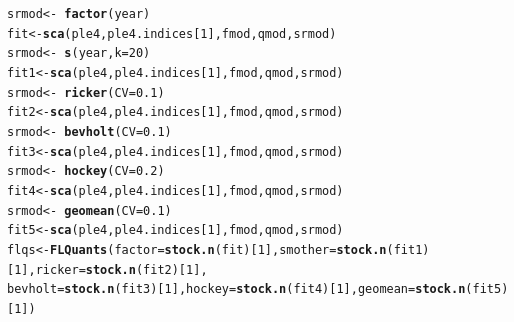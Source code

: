 \documentclass[a4paper,english,10pt]{article}\usepackage[]{graphicx}\usepackage[]{color}
\makeatletter
\newcommand{\hlnum}[1]{\textcolor[rgb]{0.686,0.059,0.569}{#1}}%
\newcommand{\hlopt}[1]{\textcolor[rgb]{0,0,0}{#1}}%
\newcommand{\hlstd}[1]{\textcolor[rgb]{0.345,0.345,0.345}{#1}}%
\newcommand{\hlkwb}[1]{\textcolor[rgb]{0.69,0.353,0.396}{#1}}%
\newcommand{\hlkwc}[1]{\textcolor[rgb]{0.333,0.667,0.333}{#1}}%
\newcommand{\hlkwd}[1]{\textcolor[rgb]{0.737,0.353,0.396}{\textbf{#1}}}%
\newenvironment{kframe}{%
 \def\at@end@of@kframe{}%
 \ifinner\ifhmode%
  \def\at@end@of@kframe{\end{minipage}}%
  \begin{minipage}{\columnwidth}%
 \fi\fi%
 \def\FrameCommand##1{\hskip\@totalleftmargin \hskip-\fboxsep
 \colorbox{shadecolor}{##1}\hskip-\fboxsep
     \hskip-\linewidth \hskip-\@totalleftmargin \hskip\columnwidth}%
 \MakeFramed {\advance\hsize-\width
   \@totalleftmargin\z@ \linewidth\hsize
   \@setminipage}}%
 {\par\unskip\endMakeFramed%
 \at@end@of@kframe}
\newenvironment{knitrout}{}{} %
\makeatother
\begin{document}
\begin{knitrout}
\color{fgcolor}\begin{kframe}
\begin{alltt}
\hlstd{srmod} \hlkwb{<-} \hlopt{~}\hlkwd{factor}\hlstd{(year)}
\hlstd{fit} \hlkwb{<-} \hlkwd{sca}\hlstd{(ple4, ple4.indices[}\hlnum{1}\hlstd{], fmod, qmod, srmod)}
\hlstd{srmod} \hlkwb{<-} \hlopt{~}\hlkwd{s}\hlstd{(year,} \hlkwc{k} \hlstd{=} \hlnum{20}\hlstd{)}
\hlstd{fit1} \hlkwb{<-} \hlkwd{sca}\hlstd{(ple4, ple4.indices[}\hlnum{1}\hlstd{], fmod, qmod, srmod)}
\hlstd{srmod} \hlkwb{<-} \hlopt{~}\hlkwd{ricker}\hlstd{(}\hlkwc{CV} \hlstd{=} \hlnum{0.1}\hlstd{)}
\hlstd{fit2} \hlkwb{<-} \hlkwd{sca}\hlstd{(ple4, ple4.indices[}\hlnum{1}\hlstd{], fmod, qmod, srmod)}
\hlstd{srmod} \hlkwb{<-} \hlopt{~}\hlkwd{bevholt}\hlstd{(}\hlkwc{CV} \hlstd{=} \hlnum{0.1}\hlstd{)}
\hlstd{fit3} \hlkwb{<-} \hlkwd{sca}\hlstd{(ple4, ple4.indices[}\hlnum{1}\hlstd{], fmod, qmod, srmod)}
\hlstd{srmod} \hlkwb{<-} \hlopt{~}\hlkwd{hockey}\hlstd{(}\hlkwc{CV} \hlstd{=} \hlnum{0.2}\hlstd{)}
\hlstd{fit4} \hlkwb{<-} \hlkwd{sca}\hlstd{(ple4, ple4.indices[}\hlnum{1}\hlstd{], fmod, qmod, srmod)}
\hlstd{srmod} \hlkwb{<-} \hlopt{~}\hlkwd{geomean}\hlstd{(}\hlkwc{CV} \hlstd{=} \hlnum{0.1}\hlstd{)}
\hlstd{fit5} \hlkwb{<-} \hlkwd{sca}\hlstd{(ple4, ple4.indices[}\hlnum{1}\hlstd{], fmod, qmod, srmod)}
\hlstd{flqs} \hlkwb{<-} \hlkwd{FLQuants}\hlstd{(}\hlkwc{factor} \hlstd{=} \hlkwd{stock.n}\hlstd{(fit)[}\hlnum{1}\hlstd{],} \hlkwc{smother} \hlstd{=} \hlkwd{stock.n}\hlstd{(fit1)[}\hlnum{1}\hlstd{],} \hlkwc{ricker} \hlstd{=} \hlkwd{stock.n}\hlstd{(fit2)[}\hlnum{1}\hlstd{],}
    \hlkwc{bevholt} \hlstd{=} \hlkwd{stock.n}\hlstd{(fit3)[}\hlnum{1}\hlstd{],} \hlkwc{hockey} \hlstd{=} \hlkwd{stock.n}\hlstd{(fit4)[}\hlnum{1}\hlstd{],} \hlkwc{geomean} \hlstd{=} \hlkwd{stock.n}\hlstd{(fit5)[}\hlnum{1}\hlstd{])}
\end{alltt}
\end{kframe}
\end{knitrout}
\end{document}
